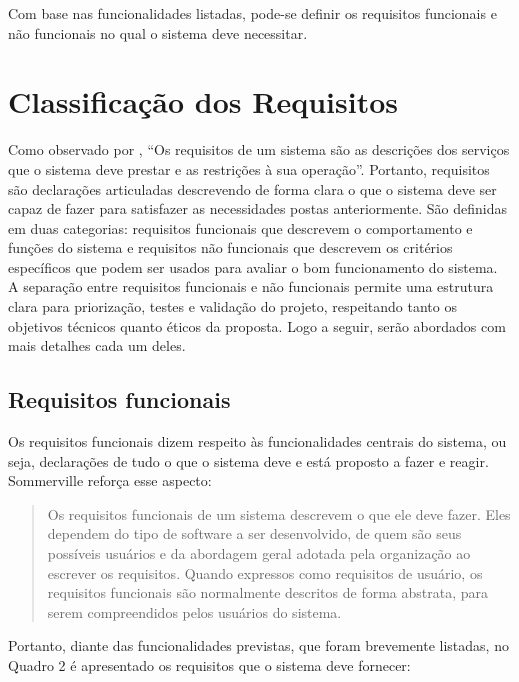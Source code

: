 Com base nas funcionalidades listadas, pode-se definir os requisitos funcionais
e não funcionais no qual o sistema deve necessitar.

\section{Classificação dos Requisitos}

Como observado por \cite[p.~58]{sommerville:2010}, ``Os requisitos de um sistema são
as descrições dos serviços que o sistema deve prestar e as restrições à sua
operação''. Portanto, requisitos são declarações articuladas descrevendo de
forma clara o que o sistema deve ser capaz de fazer para satisfazer as
necessidades postas anteriormente. São definidas em duas categorias: requisitos
funcionais que descrevem o comportamento e funções do sistema e requisitos não
funcionais que descrevem os critérios específicos que podem ser usados para
avaliar o bom funcionamento do sistema. A separação entre requisitos funcionais
e não funcionais permite uma estrutura clara para priorização, testes e
validação do projeto, respeitando tanto os objetivos técnicos quanto éticos da
proposta. Logo a seguir, serão abordados com mais detalhes cada um deles.

\subsection{Requisitos funcionais}

Os requisitos funcionais dizem respeito às funcionalidades centrais do sistema,
ou seja, declarações de tudo o que o sistema deve e está proposto a fazer e
reagir. Sommerville reforça esse aspecto:

\begin{quote}

  Os requisitos funcionais de um sistema descrevem o que ele deve fazer. Eles
  dependem do tipo de software a ser desenvolvido, de quem são seus possíveis
  usuários e da abordagem geral adotada pela organização ao escrever os
  requisitos. Quando expressos como requisitos de usuário, os requisitos
  funcionais são normalmente descritos de forma abstrata, para serem
  compreendidos pelos usuários do sistema.

  \cite[p.~59]{sommerville:2010}
\end{quote}

Portanto, diante das funcionalidades previstas, que foram brevemente listadas,
no Quadro 2 é apresentado os requisitos que o sistema deve fornecer:

